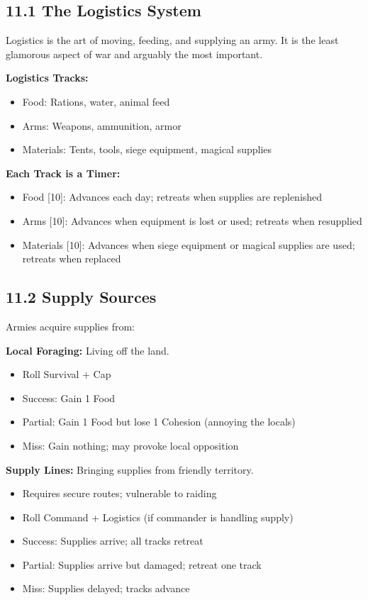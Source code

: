 \documentclass[11pt]{article}
\begin{document}
\subsection{11.1 The Logistics System}

Logistics is the art of moving, feeding, and supplying an army. It is the least glamorous aspect of war and arguably the most important.

\textbf{Logistics Tracks:}
\begin{itemize}
  \item Food: Rations, water, animal feed
  \item Arms: Weapons, ammunition, armor
  \item Materials: Tents, tools, siege equipment, magical supplies
\end{itemize}

\textbf{Each Track is a Timer:}
\begin{itemize}
  \item Food [10]: Advances each day; retreats when supplies are replenished
  \item Arms [10]: Advances when equipment is lost or used; retreats when resupplied
  \item Materials [10]: Advances when siege equipment or magical supplies are used; retreats when replaced
\end{itemize}

\subsection{11.2 Supply Sources}

Armies acquire supplies from:

\textbf{Local Foraging:} Living off the land.
\begin{itemize}
  \item Roll Survival + Cap
  \item Success: Gain 1 Food
  \item Partial: Gain 1 Food but lose 1 Cohesion (annoying the locals)
  \item Miss: Gain nothing; may provoke local opposition
\end{itemize}

\textbf{Supply Lines:} Bringing supplies from friendly territory.
\begin{itemize}
  \item Requires secure routes; vulnerable to raiding
  \item Roll Command + Logistics (if commander is handling supply)
  \item Success: Supplies arrive; all tracks retreat
  \item Partial: Supplies arrive but damaged; retreat one track
  \item Miss: Supplies delayed; tracks advance
\end{itemize}
\end{document}
